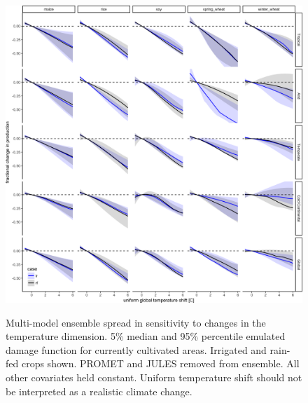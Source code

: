 \documentclass[10pt]{article}
\begin{document}
\begin{figure}[h!]
\includegraphics[width=\textwidth]{s_temp.png}\\
\caption{Multi-model ensemble spread in sensitivity to changes in the temperature dimension. 5\% median and 95\% percentile emulated damage function for currently cultivated areas. Irrigated and rain-fed crops shown. PROMET and JULES removed from ensemble. All other covariates held constant. Uniform temperature shift should not be interpreted as a realistic climate change.}
\label{fig:temperature}
\end{figure}
\end{document}
